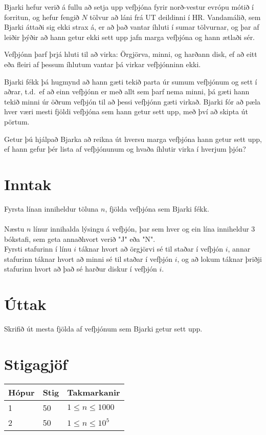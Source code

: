 %
Bjarki hefur verið á fullu að setja upp vefþjóna fyrir norð-vestur evrópu mótið í forritun, og hefur fengið $N$ tölvur að láni frá UT deildinni í HR.
Vandamálið, sem Bjarki áttaði sig ekki strax á, er að það vantar íhluti í sumar tölvurnar, og þar af leiðir þýðir að hann getur ekki sett upp jafn marga vefþjóna og hann ætlaði sér.

Vefþjónn þarf þrjá hluti til að virka: Örgjörva, minni, og harðann disk, ef að eitt eða fleiri af þessum íhlutum vantar þá virkar vefþjónninn ekki.

Bjarki fékk þá hugmynd að hann gæti tekið parta úr sumum vefþjónum og sett í aðrar, t.d.\ ef að einn vefþjónn er með allt sem þarf nema minni, þá gæti hann tekið minni úr öðrum vefþjón til að þessi vefþjónn gæti virkað. Bjarki fór að pæla hver væri mesti fjöldi vefþjóna sem hann getur sett upp, með því að skipta út pörtum.

Getur þú hjálpað Bjarka að reikna út hversu marga vefþjóna hann getur sett upp, ef hann gefur þér lista af vefþjónunum og hvaða íhlutir virka í hverjum þjón?


\section*{Inntak}
Fyrsta línan inniheldur töluna $n$, fjölda vefþjóna sem Bjarki fékk.\\
\\
Næstu $n$ línur innihalda lýsingu á vefþjón, þar sem hver og ein lína inniheldur 3 bókstafi, sem geta annaðhvort verið "J" eða "N". \\
Fyrsti stafurinn í línu $i$ táknar hvort að örgjörvi sé til staðar í vefþjón $i$, annar stafurinn táknar hvort að minni sé til staðar í vefþjón $i$, og að lokum táknar þriðji stafurinn hvort að það sé harður diskur í vefþjón $i$.\\

\section*{Úttak}
Skrifið út mesta fjölda af vefþjónum sem Bjarki getur sett upp.

\section*{Stigagjöf}
\begin{tabular}{|l|l|l|}
\hline
Hópur & Stig & Takmarkanir \\ \hline
1     & 50   & $1 \leq n \leq 1000$ \\ \hline
2     & 50   & $1 \leq n \leq 10^5$\\ \hline
\end{tabular}
